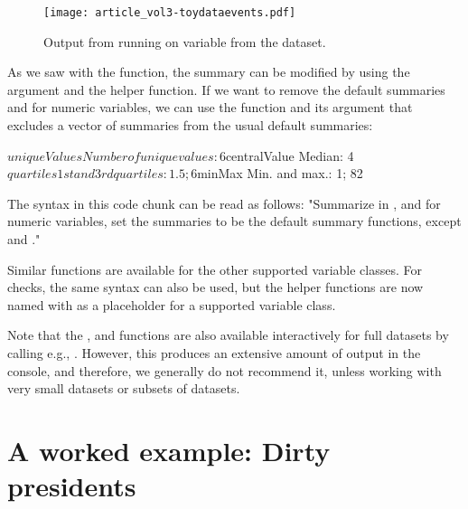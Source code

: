 \documentclass[article,shortnames]{jss}
\begin{document}
\begin{figure}[tb]
\begin{center}
\texttt{[image: article\_vol3-toydataevents.pdf]}
\end{center}
\caption{Output from running  on variable  from the
 dataset.}
\label{fig:example3}
\end{figure}


As we saw with the  function, the summary can be modified
by using the  argument and the  helper function. If we want to remove the default summaries  and  for numeric variables, we can use the function  and its argument  that excludes a vector of summaries from the usual default summaries:


\begin{Schunk}
\begin{Soutput}
$uniqueValues
Number of unique values: 6
$centralValue
Median: 4
$quartiles
1st and 3rd quartiles: 1.5; 6
$minMax
Min. and max.: 1; 82
\end{Soutput}
\end{Schunk}

The syntax in this code chunk can be read as follows: "Summarize  in , and for numeric variables, set the summaries to be the default summary functions, except  and ." 

Similar  functions are available for the other supported variable classes. For checks, the same syntax can also be used, but the helper functions are now named  with  as a placeholder for a supported variable class.

Note that the ,  and  functions are also available interactively for full datasets by calling e.g., . However, this produces an extensive amount of output in the console, and therefore, we generally do not recommend it, unless working with very small datasets or subsets of datasets.

\section{A worked example: Dirty presidents} 
\label{sec:bigExample}
\end{document}
